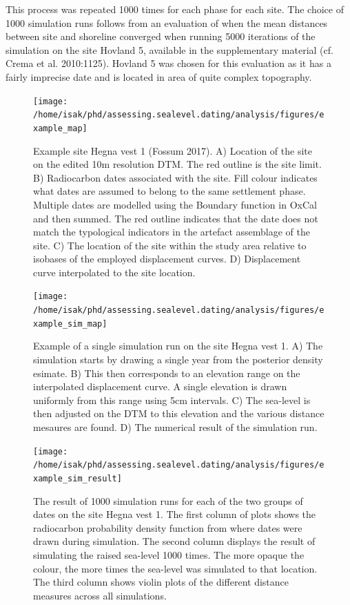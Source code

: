 \documentclass[
]{article}
\begin{document}
This process was repeated 1000 times for each phase for each site. The choice of 1000 simulation runs follows from an evaluation of when the mean distances between site and shoreline converged when running 5000 iterations of the simulation on the site Hovland 5, available in the supplementary material (cf. Crema et al. 2010:1125). Hovland 5 was chosen for this evaluation as it has a fairly imprecise date and is located in area of quite complex topography.

\begin{figure}

{\centering \texttt{[image: /home/isak/phd/assessing.sealevel.dating/analysis/figures/example\_map]} 

}

\caption{Example site Hegna vest 1 (Fossum 2017). A) Location of the site on the edited 10m resolution DTM. The red outline is the site limit. B) Radiocarbon dates associated with the site. Fill colour indicates what dates are assumed to belong to the same settlement phase. Multiple dates are modelled using the Boundary function in OxCal and then summed. The red outline indicates that the date does not match the typological indicators in the artefact assemblage of the site. C) The location of the site within the study area relative to isobases of the employed displacement curves. D) Displacement curve interpolated to the site location.}\label{fig:example-1}
\end{figure}

\begin{figure}

{\centering \texttt{[image: /home/isak/phd/assessing.sealevel.dating/analysis/figures/example\_sim\_map]} 

}

\caption{Example of a single simulation run on the site Hegna vest 1. A) The simulation starts by drawing a single year from the posterior density esimate.  B) This then corresponds to an elevation range on the interpolated displacement curve. A single elevation is drawn uniformly from this range using 5cm intervals. C) The sea-level is then adjusted on the DTM to this elevation and the various distance mesaures are found. D) The numerical result of the simulation run.}\label{fig:example-2}
\end{figure}

\begin{figure}

{\centering \texttt{[image: /home/isak/phd/assessing.sealevel.dating/analysis/figures/example\_sim\_result]} 

}

\caption{The result of 1000 simulation runs for each of the two groups of dates on the site Hegna vest 1. The first column of plots shows the radiocarbon probability density function from where dates were drawn during simulation. The second column displays the result of simulating the raised sea-level 1000 times. The more opaque the colour, the more times the sea-level was simulated to that location. The third column shows violin plots of the different distance measures across all simulations.}\label{fig:example-3}
\end{figure}
\end{document}
